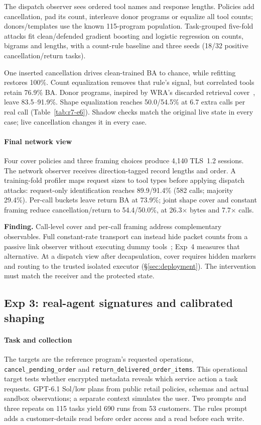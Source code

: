 The dispatch observer sees ordered tool names and response lengths. Policies add cancellation, pad its count, interleave donor programs or equalize all tool counts; donors/templates use the known 115-program population. Task-grouped five-fold attacks fit clean/defended gradient boosting and logistic regression on counts, bigrams and lengths, with a count-rule baseline and three seeds (18/32 positive cancellation/return tasks).

One inserted cancellation drives clean-trained BA to chance, while refitting restores 100\%. Count equalization removes that rule's signal, but correlated tools retain 76.9\% BA. Donor programs, inspired by WRA's discarded retrieval cover~\cite{jeong2026wra}, leave 83.5--91.9\%. Shape equalization reaches 50.0/54.5\% at 6.7 extra calls per real call (Table~\ref{tab:r7-e6}). Shadow checks match the original live state in every case; live cancellation changes it in every case.

\paragraph{Final network view}
Four cover policies and three framing choices produce 4,140 TLS~1.2 sessions. The network observer receives direction-tagged record lengths and order. A training-fold profiler maps request sizes to tool types before applying dispatch attacks: request-only identification reaches 89.9/91.4\% (582 calls; majority 29.4\%). Per-call buckets leave return BA at 73.9\%; joint shape cover and constant framing reduce cancellation/return to 54.4/50.0\%, at 26.3$\times$ bytes and 7.7$\times$ calls.

\textbf{Finding.} Call-level cover and per-call framing address complementary observables. Full constant-rate transport can instead hide packet counts from a passive link observer without executing dummy tools~\cite{rfc9347}; Exp~4 measures that alternative. At a dispatch view after decapsulation, cover requires hidden markers and routing to the trusted isolated executor (\S\ref{sec:deployment}). The intervention must match the receiver and the protected state.

\subsection{Exp 3: real-agent signatures and calibrated shaping}\label{sec:real-agent}\label{sec:r5}
\paragraph{Task and collection}
The targets are the reference program's requested operations, \texttt{cancel\_pending\_order} and \texttt{return\_delivered\_order\_items}. This operational target tests whether encrypted metadata reveals which service action a task requests. GPT-6.1 Sol/low plans from public retail policies, schemas and actual sandbox observations; a separate context simulates the user. Two prompts and three repeats on 115 tasks yield 690 runs from 53 customers. The rules prompt adds a customer-details read before order access and a read before each write.

